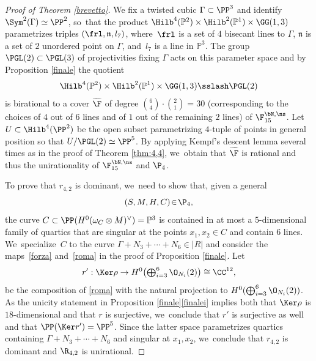 \begin{proof}[Proof of Theorem \ref{brevetto}]
\Changel
We fix a twisted cubic $\Gamma\subset \PP^3$ and identify $\Sym ^2(\Gamma)\simeq \PP^2$, so~that the product $ \Hilb^4(\mathbb P^2)\times \Hilb^2(\mathbb P^1)\times \GG(1,3)$ parametrizes triples $(\frl,\mathfrak n,l_7)$, where~$\frl$ is a set of $4$ bisecant lines to $\Gamma$, $\mathfrak n$ is a set of $2$ unordered point on $\Gamma$, and~$l_7$ is a line in $\mathbb P^3$. The group $\PGL(2)\subset \PGL(3)$ of projectivities fixing $\Gamma$ acts on this parameter space and by Proposition \ref{finale} the quotient
\[
\Hilb^4(\mathbb P^2)\times \Hilb^2(\mathbb P^1)\times \GG(1,3)\sslash\PGL(2)
\]
is birational to a cover $\widetilde \F$ of degree $\binom{6}{4}\cdot \binom{2}{1}=30$ (corresponding to the choices of $4$ out of $6$ lines and of $1$ out of the remaining $2$ lines) of $\F_{15}^{\bN,\ns}$. Let $U\subset \Hilb^4({\PP^2})$ be the open subset parametrizing $4$-tuple of points in general position so that $U/\PGL(2)\simeq \PP^5$. By applying Kempf's descent lemma several times as in the proof of Theorem \ref{thm:4,4}, we~obtain that $\widetilde \F$ is rational and thus the unirationality of $\F_{15}^{\bN,\ns}$ and $\P_{4}$.

To prove that $r_{4,2}$ is dominant, we~need to show that, given a general 
\[
(S,M,H,C)\!\in\!\P_{4},
\]
the curve $C\subset\PP(H^0(\omega_C\otimes M)^\vee)= \mathbb P^3$ is contained in at most a $5$-dimensional family of quartics that are singular at the points $x_1,x_2\in C$ and contain $6$ lines. We~specialize~$C$ to the curve $\Gamma+N_3+\cdots+ N_6\in |R|$ and consider the maps~\eqref{forza} and~\eqref{roma} in the proof of Proposition \ref{finale}. Let
\begin{equation*}
r': \Ker \rho \to H^0\bigl(\textstyle\bigoplus_{i=3}^6 \O_{N_i}(2)\bigr)\cong \CC^{12},
\end{equation*}
be the composition of \eqref{roma} with the natural projection to $H^0(\bigoplus_{i=3}^6 \O_{N_i}(2))$. As the unicity statement in Proposition \ref{finale}\eqref{finalei} implies both that $\Ker \rho$ is $18$-dimensional and that $r$ is surjective, we~conclude that $r'$ is surjective as well and that $\PP(\Ker r')=\PP^5$. Since the latter space parametrizes quartics containing $\Gamma+N_3+\cdots+ N_6$ and singular at $x_1,x_2$, we~conclude that $r_{4,2}$ is dominant and $\R_{4,2}$ is unirational.


\end{proof}
